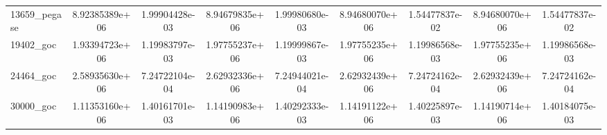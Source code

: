 \begin{tabular}{|l|cc|cc|cc|cc|}
13659\_pegase 
& 8.92385389e+06
& 1.99904428e-03
& 8.94679835e+06
& 1.99980680e-03
& 8.94680070e+06
& 1.54477837e-02
& 8.94680070e+06
& 1.54477837e-02
\\

19402\_goc 
& 1.93394723e+06
& 1.19983797e-03
& 1.97755237e+06
& 1.19999867e-03
& 1.97755235e+06
& 1.19986568e-03
& 1.97755235e+06
& 1.19986568e-03
\\

24464\_goc 
& 2.58935630e+06
& 7.24722104e-04
& 2.62932336e+06
& 7.24944021e-04
& 2.62932439e+06
& 7.24724162e-04
& 2.62932439e+06
& 7.24724162e-04
\\

30000\_goc 
& 1.11353160e+06
& 1.40161701e-03
& 1.14190983e+06
& 1.40292333e-03
& 1.14191122e+06
& 1.40225897e-03
& 1.14190714e+06
& 1.40184075e-03

  \\
  \hline
\end{tabular}
